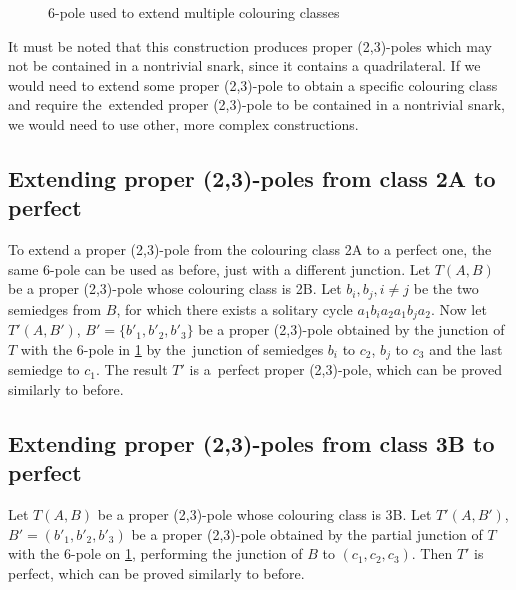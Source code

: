 \begin{figure}[h]
	\centering
	
	\caption{6-pole used to extend multiple colouring classes}
	\label{fig:multiple}
\end{figure}

It must be noted that this construction produces proper (2,3)-poles which may not be contained in a nontrivial snark, since it contains a quadrilateral. If we would need to extend some proper (2,3)-pole to obtain a specific colouring class and require the~extended proper (2,3)-pole to be contained in a nontrivial snark, we would need to use other, more complex constructions.

\subsection{Extending proper (2,3)-poles from class 2A to perfect}

To extend a proper (2,3)-pole from the colouring class 2A to a perfect one, the same 6-pole can be used as before, just with a different junction. Let $T(A,B)$ be a proper (2,3)-pole whose colouring class is 2B. Let $b_i,b_j,i\neq j$ be the two semiedges from $B$, for which there exists a solitary cycle $a_1b_ia_2a_1b_ja_2$. Now let $T'(A,B')$, $B'=\{b'_1, b'_2, b'_3\}$ be a proper (2,3)-pole obtained by the junction of $T$ with the 6-pole in \cref{fig:multiple} by the~junction of semiedges $b_i$ to $c_2$, $b_j$ to $c_3$ and the last semiedge to $c_1$. The result $T'$ is a~perfect proper (2,3)-pole, which can be proved similarly to before.


\subsection{Extending proper (2,3)-poles from class 3B to perfect}

Let $T(A,B)$ be a proper (2,3)-pole whose colouring class is 3B. Let $T'(A,B')$, \linebreak ${B'=(b'_1, b'_2, b'_3)}$ be a proper (2,3)-pole obtained by the partial junction of $T$ with the 6-pole on \cref{fig:multiple}, performing the junction of $B$ to $(c_1,c_2,c_3)$. Then $T'$ is perfect, which can be proved similarly to before.

